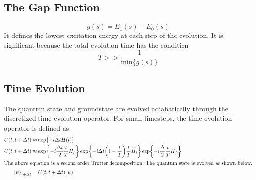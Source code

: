\documentclass{article}
\begin{document}
\subsection{The Gap Function}
$$g(s) =  E_1(s) - E_0(s)$$
It defines the lowest excitation energy at each step of the evolution. It is significant because the total evolution time has the condition $$T >> \frac{1}{\text{min} \{g(s)\} }$$

\subsection{Time Evolution}
The quantum state and groundstate are evolved adiabatically through the discretized time evolution operator. For small timesteps, the time evolution operator is defined as 
\begin{align}
    U(t, t + \Delta t) &\approx \exp{-i\Delta t H(t)} \\ 
    U(t, t+\Delta t) &\approx \exp{-i \frac{\Delta t}{2}\frac{t}{T}H_f}\exp{-i \Delta t\pqty{1-\frac{t}{T}} \frac{t}{T} H_i}\exp{-i \frac{\Delta}{2}\frac{t}{T}H_f}\\ 
    \intertext{The above equation is a second order Trotter decomposition. The quantum state is evolved as shown below.}
    \ket \psi_{t + \Delta t} &= U(t, t+\Delta t) \ket \psi
\end{align}
\end{document}
